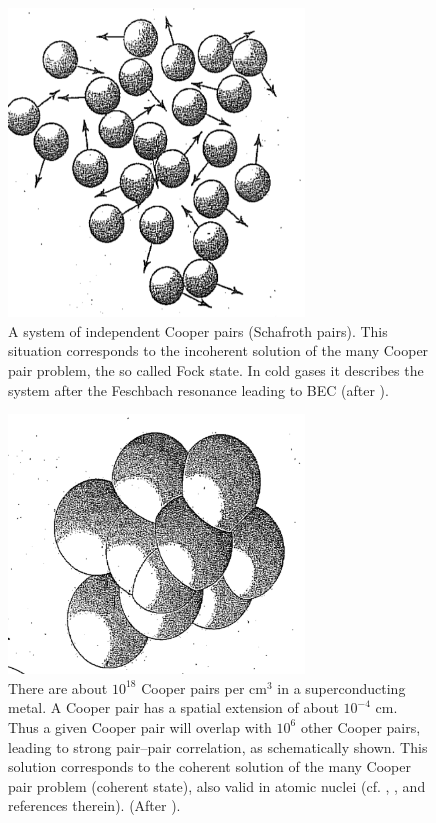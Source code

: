 \begin{figure}
\centerline{\includegraphics*[width=0.7\textwidth,angle=0]{nutshell/figs/fig1A4.pdf}}
\caption{A system of independent Cooper pairs (Schafroth pairs). This situation corresponds to the incoherent solution of the many Cooper pair problem, the so called Fock state. In cold gases it describes the system after the Feschbach resonance leading to BEC (after \cite{Rogovin:76}).}\label{fig1A4}
\end{figure}
\begin{figure}
\centerline{\includegraphics*[width=0.7\textwidth,angle=0]{nutshell/figs/fig1A5.pdf}}
\caption{There are about $10^{18}$ Cooper pairs per cm$^{3}$ in a superconducting metal. A Cooper pair has a spatial extension of about $10^{-4}$ cm. Thus a given Cooper pair will overlap with  $10^{6}$ other Cooper pairs, leading to strong pair--pair correlation, as schematically shown. This solution corresponds to the coherent solution of the many Cooper pair problem (coherent state), also valid in atomic nuclei (cf. \cite{Schrieffer:64}, \cite{Brink:05}, and references therein). (After \cite{Rogovin:76}).}\label{fig1A5}
\end{figure}
